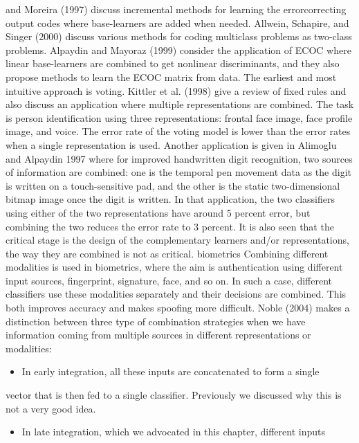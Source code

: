 and Moreira (1997) discuss incremental methods for learning the errorcorrecting output codes where base-learners are added when needed. Allwein, Schapire, and Singer (2000) discuss various methods for coding multiclass problems as two-class problems. Alpaydin and Mayoraz (1999) consider the application of ECOC where linear base-learners are combined to get nonlinear discriminants, and they also propose methods to learn the ECOC matrix from data. The earliest and most intuitive approach is voting. Kittler et al. (1998) give a review of fixed rules and also discuss an application where multiple representations are combined. The task is person identification using three representations: frontal face image, face profile image, and voice. The error rate of the voting model is lower than the error rates when a single representation is used. Another application is given in Alimoglu and Alpaydin 1997 where for improved handwritten digit recognition, two sources of information are combined: one is the temporal pen movement data as the digit is written on a touch-sensitive pad, and the other is the static two-dimensional bitmap image once the digit is written. In that application, the two classifiers using either of the two representations have around 5 percent error, but combining the two reduces the error rate to 3 percent. It is also seen that the critical stage is the design of the complementary learners and/or representations, the way they are combined is not as critical. biometrics Combining different modalities is used in biometrics, where the aim is authentication using different input sources, fingerprint, signature, face, and so on. In such a case, different classifiers use these modalities separately and their decisions are combined. This both improves accuracy and makes spoofing more difficult. Noble (2004) makes a distinction between three type of combination strategies when we have information coming from multiple sources in different representations or modalities:

\begin{itemize}
\item In early integration, all these inputs are concatenated to form a single
\end{itemize}

vector that is then fed to a single classifier. Previously we discussed why this is not a very good idea.

\begin{itemize}
\item In late integration, which we advocated in this chapter, different inputs
\end{itemize}

